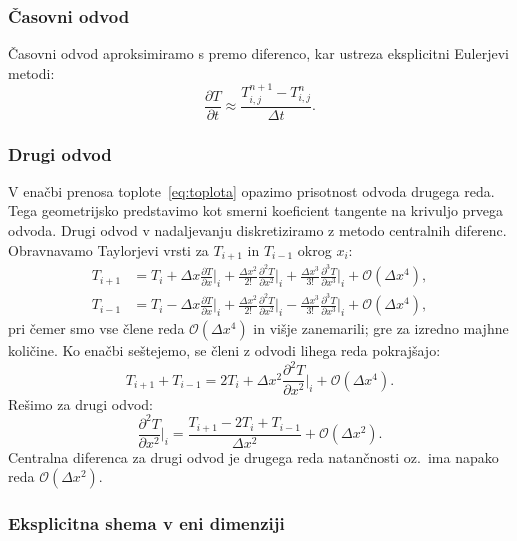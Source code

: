 \documentclass[a4paper,11pt]{article}
\begin{document}
	\subsubsection{Časovni odvod}
	
	Časovni odvod aproksimiramo s premo diferenco, kar ustreza eksplicitni Eulerjevi metodi:
	\begin{equation}
		\frac{\partial T}{\partial t} \approx \frac{T^{n+1}_{i,j} - T^{n}_{i,j}}{\Delta t}.
	\end{equation}
	
	\subsubsection{Drugi odvod}
	
	V enačbi prenosa toplote~\eqref{eq:toplota} opazimo prisotnost odvoda drugega reda. Tega geometrijsko predstavimo kot smerni koeficient tangente na krivuljo prvega odvoda. Drugi odvod v nadaljevanju diskretiziramo z metodo centralnih diferenc. Obravnavamo Taylorjevi vrsti za $T_{i+1}$ in $T_{i-1}$ okrog $x_i$:
	\begin{align}
		T_{i+1} &= T_i + \Delta x \frac{\partial T}{\partial x}\Big|_i + \frac{\Delta x^2}{2!} \frac{\partial^2 T}{\partial x^2}\Big|_i + \frac{\Delta x^3}{3!} \frac{\partial^3 T}{\partial x^3}\Big|_i + \mathcal{O}(\Delta x^4), \\
		T_{i-1} &= T_i - \Delta x \frac{\partial T}{\partial x}\Big|_i + \frac{\Delta x^2}{2!} \frac{\partial^2 T}{\partial x^2}\Big|_i - \frac{\Delta x^3}{3!} \frac{\partial^3 T}{\partial x^3}\Big|_i + \mathcal{O}(\Delta x^4),
	\end{align}
	pri čemer smo vse člene reda $\mathcal{O}(\Delta x^4)$ in višje zanemarili; gre za izredno majhne količine. Ko enačbi seštejemo, se členi z odvodi lihega reda pokrajšajo:
	\begin{equation}
		T_{i+1} + T_{i-1} = 2T_i + \Delta x^2 \frac{\partial^2 T}{\partial x^2}\Big|_i + \mathcal{O}(\Delta x^4).
	\end{equation}
	Rešimo za drugi odvod:
	\begin{equation}
		\frac{\partial^2 T}{\partial x^2}\Big|_i = \frac{T_{i+1} - 2T_i + T_{i-1}}{\Delta x^2} + \mathcal{O}(\Delta x^2).
		\label{eq:drugi_odvod}
	\end{equation}
	Centralna diferenca za drugi odvod je drugega reda natančnosti oz.\ ima napako reda $\mathcal{O}(\Delta x^2)$.
	
	\subsubsection{Eksplicitna shema v eni dimenziji}
	
\end{document}

